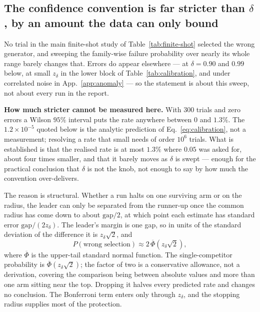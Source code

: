 \documentclass[10pt]{article}
\begin{document}
\subsection{The confidence convention is far stricter than $\delta$, by an amount the data can only bound}
\label{sec:calibration}

No trial in the main finite-shot study of Table~\ref{tab:finite-shot} selected the
wrong generator, and sweeping the family-wise failure probability over nearly its
whole range barely changes that. Errors do appear elsewhere --- at $\delta=0.90$
and $0.99$ below, at small $z_\delta$ in the lower block of Table~\ref{tab:calibration}, and under
correlated noise in App.~\ref{app:anomaly} --- so the statement is about this
sweep, not about every run in the report.

\textbf{How much stricter cannot be measured here.} With 300 trials and zero
errors a Wilson $95\%$ interval puts the rate anywhere between $0$ and $1.3\%$.
The $1.2\times10^{-5}$ quoted below is the analytic prediction of
Eq.~\eqref{eq:calibration}, not a measurement; resolving a rate that small needs
of order $10^{6}$ trials. What is established is that the realised rate is at most
$1.3\%$ where $0.05$ was asked for, about four times smaller, and that it barely
moves as $\delta$ is swept --- enough for the practical conclusion that $\delta$
is not the knob, not enough to say by how much the convention over-delivers.

The reason is structural. Whether a run halts on one surviving arm or on the
radius, the leader can only be separated from the runner-up once the common
radius has come down to about $\mathrm{gap}/2$, at which point each estimate has
standard error $\mathrm{gap}/(2z_\delta)$. The leader's margin is one gap, so in
units of the standard deviation of the difference it is $z_\delta\sqrt2$, and
\begin{equation}
  P(\text{wrong selection})\approx 2\,\overline\Phi\!\left(z_\delta\sqrt2\right),
  \label{eq:calibration}
\end{equation}
where $\overline\Phi$ is the upper-tail standard normal function. The
single-competitor probability is $\overline\Phi(z_\delta\sqrt2)$; the factor of
two is a conservative allowance, not a derivation, covering the comparison being
between absolute values and more than one arm sitting near the top. Dropping it
halves every predicted rate and changes no conclusion. The Bonferroni term enters
only through $z_\delta$, and the stopping radius supplies most of the protection.
\end{document}
